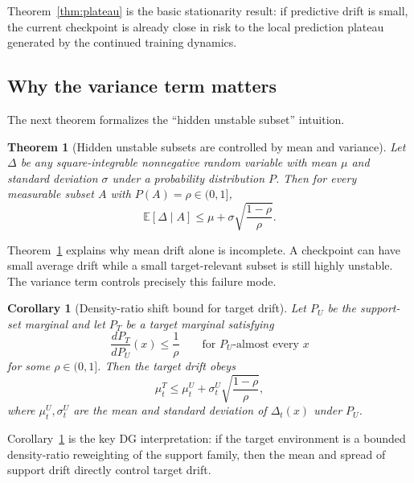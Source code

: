 \documentclass{article}
\newtheorem{theorem}{Theorem}
\newtheorem{corollary}{Corollary}
\newcommand{\EE}{\mathbb{E}}
\begin{document}
Theorem~\ref{thm:plateau} is the basic stationarity result: if predictive drift is small, the current checkpoint is already close in risk to the local prediction plateau generated by the continued training dynamics.

\subsection{Why the variance term matters}

The next theorem formalizes the ``hidden unstable subset'' intuition.

\begin{theorem}[Hidden unstable subsets are controlled by mean and variance]
\label{thm:subset}
Let $\Delta$ be any square-integrable nonnegative random variable with mean $\mu$ and standard deviation $\sigma$ under a probability distribution $P$. Then for every measurable subset $A$ with $P(A)=\rho \in (0,1]$,
\begin{equation}
    \EE[\Delta \mid A]
    \le
    \mu + \sigma \sqrt{\frac{1-\rho}{\rho}}.
    \label{eq:subset}
\end{equation}
\end{theorem}

Theorem~\ref{thm:subset} explains why mean drift alone is incomplete. A checkpoint can have small average drift while a small target-relevant subset is still highly unstable. The variance term controls precisely this failure mode.

\begin{corollary}[Density-ratio shift bound for target drift]
\label{cor:density}
Let $P_U$ be the support-set marginal and let $P_T$ be a target marginal satisfying
\begin{equation}
    \frac{dP_T}{dP_U}(x) \le \frac{1}{\rho}
    \qquad
    \text{for } P_U\text{-almost every } x
\end{equation}
for some $\rho \in (0,1]$. Then the target drift obeys
\begin{equation}
    \mu_t^T
    \le
    \mu_t^U + \sigma_t^U \sqrt{\frac{1-\rho}{\rho}},
    \label{eq:density_bound}
\end{equation}
where $\mu_t^U,\sigma_t^U$ are the mean and standard deviation of $\Delta_t(x)$ under $P_U$.
\end{corollary}

Corollary~\ref{cor:density} is the key DG interpretation: if the target environment is a bounded density-ratio reweighting of the support family, then the mean and spread of support drift directly control target drift.
\end{document}
